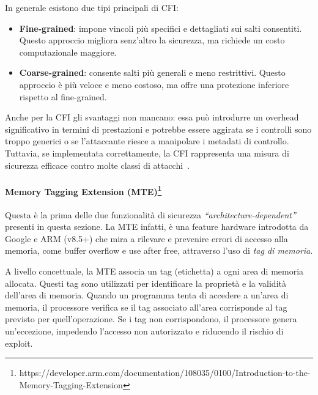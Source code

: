 In generale esistono due tipi principali di CFI:
\begin{itemize}
  \item \textbf{Fine-grained}: impone vincoli più specifici e dettagliati sui salti
    consentiti. Questo approccio migliora senz'altro la sicurezza, ma richiede un
    costo computazionale maggiore.

  \item \textbf{Coarse-grained}: consente salti più generali e meno restrittivi.
    Questo approccio è più veloce e meno costoso, ma offre una protezione inferiore
    rispetto al fine-grained.
\end{itemize}

Anche per la CFI gli svantaggi non mancano: essa può introdurre un overhead
significativo in termini di prestazioni e potrebbe essere aggirata se i
controlli sono troppo generici o se l'attaccante riesce a manipolare i metadati
di controllo. Tuttavia, se implementata correttamente, la CFI rappresenta una misura
di sicurezza efficace contro molte classi di attacchi~\cite{control_flow_integrity}.

\paragraph{Memory Tagging Extension (MTE)\protect\footnote{https://developer.arm.com/documentation/108035/0100/Introduction-to-the-Memory-Tagging-Extension}}
Questa è la prima delle due funzionalità di sicurezza \textit{``architecture-dependent''}
presenti in questa sezione. La MTE infatti, è una feature hardware introdotta da
Google e ARM (v8.5+) che mira a rilevare e prevenire errori di accesso alla
memoria, come buffer overflow e use after free, attraverso l'uso di \textit{tag
di memoria}.

A livello concettuale, la MTE associa un tag (etichetta) a ogni area di memoria
allocata. Questi tag sono utilizzati per identificare la proprietà e la validità
dell'area di memoria. Quando un programma tenta di accedere a un'area di memoria,
il processore verifica se il tag associato all'area corrisponde al tag previsto per
quell'operazione. Se i tag non corrispondono, il processore genera un'eccezione,
impedendo l'accesso non autorizzato e riducendo il rischio di exploit.

